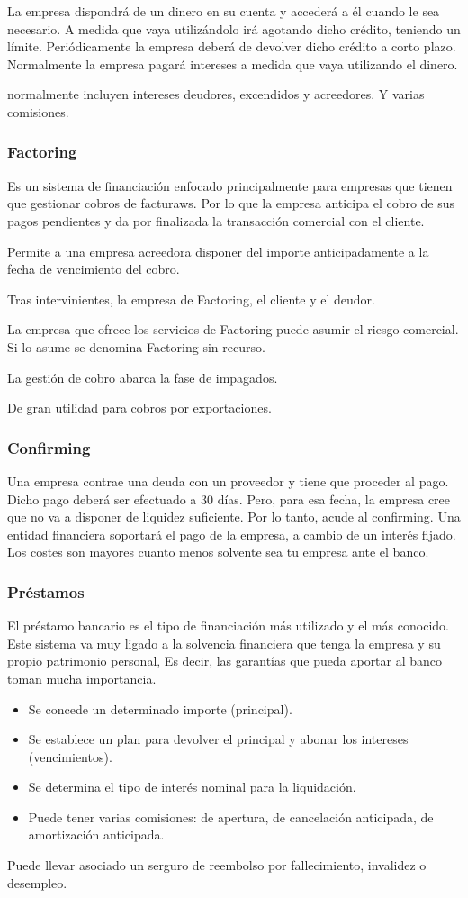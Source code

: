 La empresa dispondrá de un dinero en su cuenta y accederá a él cuando le sea necesario. A medida que vaya utilizándolo irá agotando dicho crédito, teniendo un límite. Periódicamente la empresa deberá de devolver dicho crédito a corto plazo. Normalmente la empresa pagará intereses a medida que vaya utilizando el dinero.

normalmente incluyen intereses deudores, excendidos y acreedores. Y varias comisiones.

\subsubsection{Factoring}
Es un sistema de financiación enfocado principalmente para empresas que tienen que gestionar cobros de facturaws. Por lo que la empresa anticipa el cobro de sus pagos pendientes y da por finalizada la transacción comercial con el cliente.

Permite a una empresa acreedora disponer del importe anticipadamente a la fecha de vencimiento del cobro.

Tras intervinientes, la empresa de Factoring, el cliente y el deudor.

La empresa que ofrece los servicios de Factoring puede asumir el riesgo comercial. Si lo asume se denomina Factoring sin recurso.

La gestión de cobro abarca la fase de impagados.

De gran utilidad para cobros por exportaciones.

\subsubsection{Confirming}
Una empresa contrae una deuda con un proveedor y tiene que proceder al pago. Dicho pago deberá ser efectuado a 30 días. Pero, para esa fecha, la empresa cree que no va a disponer de liquidez suficiente. Por lo tanto, acude al confirming. Una entidad financiera soportará el pago de la empresa, a cambio de un interés fijado. Los costes son mayores cuanto menos solvente sea tu empresa ante el banco.

\subsubsection{Préstamos}
El préstamo bancario es el tipo de financiación más utilizado y el más conocido. Este sistema va muy ligado a la solvencia financiera que tenga la empresa y su propio patrimonio personal, Es decir, las garantías que pueda aportar al banco toman mucha importancia.
\begin{itemize}
    \item Se concede un determinado importe (principal).
    \item Se establece un plan para devolver el principal y abonar los intereses (vencimientos).
    \item Se determina el tipo de interés nominal para la liquidación.
    \item Puede tener varias comisiones: de apertura, de cancelación anticipada, de amortización anticipada.
\end{itemize}
Puede llevar asociado un serguro de reembolso por fallecimiento, invalidez o desempleo.

